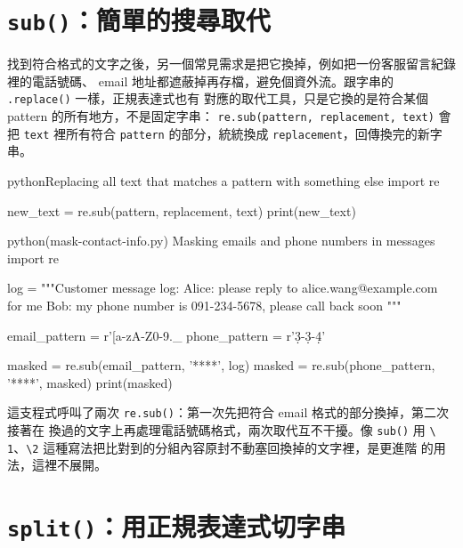 \section{\texttt{sub()}：簡單的搜尋取代}
\label{sec:regex-sub}

找到符合格式的文字之後，另一個常見需求是把它換掉，例如把一份客服留言紀錄裡的電話號碼、
email 地址都遮蔽掉再存檔，避免個資外流。跟字串的 \texttt{.replace()} 一樣，正規表達式也有
對應的取代工具，只是它換的是符合某個 pattern 的所有地方，不是固定字串：
\texttt{re.sub(pattern, replacement, text)} 會把 \texttt{text} 裡所有符合 \texttt{pattern}
的部分，統統換成 \texttt{replacement}，回傳換完的新字串。

\begin{code}{python}{Replacing all text that matches a pattern with something else}
import re

new_text = re.sub(pattern, replacement, text)
print(new_text)
\end{code}

\begin{example}{python}{(mask-contact-info.py) Masking emails and phone numbers in messages}
import re

log = """Customer message log:
Alice: please reply to alice.wang@example.com for me
Bob: my phone number is 091-234-5678, please call back soon
"""

email_pattern = r'[a-zA-Z0-9._%
phone_pattern = r'\d{3}-\d{3}-\d{4}'

masked = re.sub(email_pattern, '****', log)
masked = re.sub(phone_pattern, '****', masked)
print(masked)
\end{example}


這支程式呼叫了兩次 \texttt{re.sub()}：第一次先把符合 email 格式的部分換掉，第二次接著在
換過的文字上再處理電話號碼格式，兩次取代互不干擾。像 \texttt{sub()} 用 \texttt{\textbackslash
1}、\texttt{\textbackslash 2} 這種寫法把比對到的分組內容原封不動塞回換掉的文字裡，是更進階
的用法，這裡不展開。

\section{\texttt{split()}：用正規表達式切字串}
\label{sec:regex-split}

